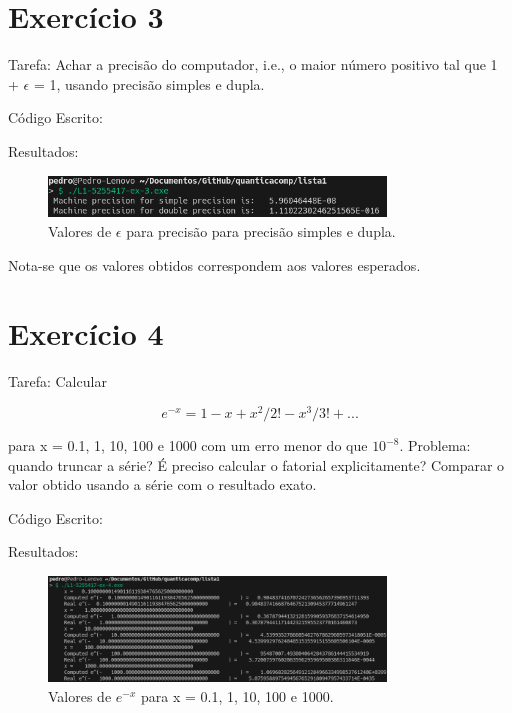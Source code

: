 \documentclass[12pt, a4paper]{article} %
\begin{document}
\section{Exerc\'icio 3}

    Tarefa: Achar a precis\~ao  do computador, i.e., o maior n\'umero positivo  tal que
    1 + $\epsilon$ = 1, usando precis\~ao simples e dupla.

    C\'odigo Escrito:
    

    Resultados:
    \begin{figure}[H]
        \centering
        \includegraphics[width=0.8\textwidth]{../images/results-ex3.png}
        \caption{Valores de $\epsilon$ para precis\~ao para precis\~ao simples e dupla.}
    \end{figure}

    Nota-se que os valores obtidos correspondem aos valores esperados.

\section{Exerc\'icio 4}

    Tarefa: Calcular

    \begin{equation} e^{-x} = 1 - x + x^2/2! - x^3/3! + ... \end{equation}

    para x = 0.1, 1, 10, 100 e 1000 com um erro menor do que $10^{-8}$. Problema: quando truncar a s\'erie? \'E preciso calcular o fatorial explicitamente? Comparar o valor obtido usando a s\'erie com o resultado exato.

    C\'odigo Escrito:
    

    Resultados:
    \begin{figure}[H]
        \centering
        \includegraphics[width=0.8\textwidth]{../images/results-ex4.png}
        \caption{Valores de $e^{-x}$ para x = 0.1, 1, 10, 100 e 1000.}
    \end{figure}
\end{document}
